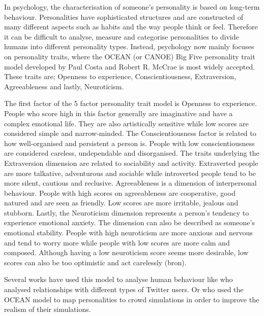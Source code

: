 In psychology, the characterisation of someone's personality is based on long-term behaviour. Personalities have sophisticated structures and are constructed of many different aspects such as habits and the way people think or feel. Therefore it can be difficult to analyse, measure and categorise personalities to divide humans into different personality types. Instead, psychology now mainly focuses on personality traits, where the OCEAN (or CANOE) Big Five personality trait model developed by Paul Costa and Robert R. McCrae is most widely accepted. These traits are; Openness to experience, Conscientiousness, Extraversion, Agreeableness and lastly, Neuroticism. 

The first factor of the 5 factor personality trait model is Openness to experience. People who score high in this factor generally are imaginative and have a complex emotional life. They are also artistically sensitive while low scores are considered simple and narrow-minded. The Conscientiousness factor is related to how well-organised and persistent a person is. People with low conscientiousness are considered careless, undependable and disorganised. The traits underlying the Extraversion dimension are related to sociability and activity. Extraverted people are more talkative, adventurous and sociable while introverted people tend to be more silent, cautious and reclusive. Agreeableness is a dimension of interpersonal behaviour. People with high scores on agreeableness are cooperative, good natured and are seen as friendly. Low scores are more irritable, jealous and stubborn. Lastly, the Neuroticism dimension represents a person's tendency to experience emotional anxiety. The dimension can also be described as someone's emotional stability. People with high neuroticism are more anxious and nervous and tend to worry more while people with low scores are more calm and composed. Although having a low neuroticism score seems more desirable, low scores can also be too optimistic and act carelessly (bron). 

Several works have used this model to analyse human behaviour like \cite{quercia2011our} who analysed relationships with different types of Twitter users. Or \cite{allbeck2008creating} who used the OCEAN model to map personalities to crowd simulations in order to improve the realism of their simulations. 
